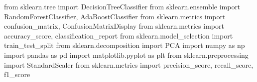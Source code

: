 \documentclass[
  letterpaper,
  DIV=11,
  numbers=noendperiod]{scrartcl}
\newenvironment{Shaded}{\begin{snugshade}}{\end{snugshade}}
\newcommand{\ImportTok}[1]{\textcolor[rgb]{0.00,0.46,0.62}{#1}}
\newcommand{\NormalTok}[1]{\textcolor[rgb]{0.00,0.23,0.31}{#1}}
\begin{document}
\begin{Shaded}
\begin{Highlighting}[]
\ImportTok{from}\NormalTok{ sklearn.tree }\ImportTok{import}\NormalTok{ DecisionTreeClassifier}
\ImportTok{from}\NormalTok{ sklearn.ensemble }\ImportTok{import}\NormalTok{ RandomForestClassifier, AdaBoostClassifier}
\ImportTok{from}\NormalTok{ sklearn.metrics }\ImportTok{import}\NormalTok{ confusion\_matrix, ConfusionMatrixDisplay}
\ImportTok{from}\NormalTok{ sklearn.metrics }\ImportTok{import}\NormalTok{ accuracy\_score, classification\_report}
\ImportTok{from}\NormalTok{ sklearn.model\_selection }\ImportTok{import}\NormalTok{ train\_test\_split}
\ImportTok{from}\NormalTok{ sklearn.decomposition }\ImportTok{import}\NormalTok{ PCA}
\ImportTok{import}\NormalTok{ numpy }\ImportTok{as}\NormalTok{ np}
\ImportTok{import}\NormalTok{ pandas }\ImportTok{as}\NormalTok{ pd}
\ImportTok{import}\NormalTok{ matplotlib.pyplot }\ImportTok{as}\NormalTok{ plt}
\ImportTok{from}\NormalTok{ sklearn.preprocessing }\ImportTok{import}\NormalTok{ StandardScaler}
\ImportTok{from}\NormalTok{ sklearn.metrics }\ImportTok{import}\NormalTok{ precision\_score, recall\_score, f1\_score}
\end{Highlighting}
\end{Shaded}
\end{document}
